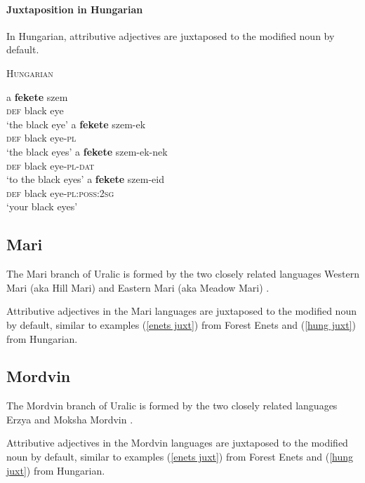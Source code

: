 \paragraph{Juxtaposition in Hungarian}
In Hungarian, attributive adjectives are juxtaposed to the modified noun by default.
\begin{exe}
\ex \textsc{Hungarian} \citep[41]{hall1938} \label{hung juxt}
\begin{xlist}
\ex 
\gll	a \textbf{fekete} szem\\
	\textsc{def} black eye\\
\glt	‘the black eye’
\ex	
\gll	a \textbf{fekete} szem-ek\\
	\textsc{def} black eye-\textsc{pl}\\
\glt	‘the black eyes’
\ex
\gll	a \textbf{fekete} szem-ek-nek\\
	\textsc{def} black eye-\textsc{pl}-\textsc{dat}\\
\glt	‘to the black eyes’
\ex
\gll	a \textbf{fekete} szem-eid\\
	\textsc{def} black eye-\textsc{pl:poss:2sg}\\
\glt	‘your black eyes’
\end{xlist}
\end{exe}

\subsection{Mari}
The Mari branch of Uralic is formed by the two closely related languages Western Mari (aka Hill Mari) and Eastern Mari (aka Meadow Mari) \citep[231]{salminen2007}.

\noindent Attributive adjectives in the Mari languages are juxtaposed to the modified noun by default, similar to examples (\ref{enets juxt}) from Forest Enets and (\ref{hung juxt}) from Hungarian.

\subsection{Mordvin}
The Mordvin branch of Uralic is formed by the two closely related languages Erzya and Moksha Mordvin \citep[231]{salminen2007}.

\noindent Attributive adjectives in the Mordvin languages are juxtaposed to the modified noun by default, similar to examples (\ref{enets juxt}) from Forest Enets and (\ref{hung juxt}) from Hungarian.

